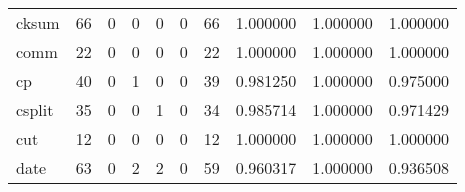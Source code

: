 \begin{longtable}{lrrrrrrrrr}
cksum     &                                      66 &                                                  0 &                                                  0 &                                                  0 &                                                  0 &                                                 66 &                                           1.000000 &                               1.000000 &                             1.000000 \\
comm      &                                      22 &                                                  0 &                                                  0 &                                                  0 &                                                  0 &                                                 22 &                                           1.000000 &                               1.000000 &                             1.000000 \\
cp        &                                      40 &                                                  0 &                                                  1 &                                                  0 &                                                  0 &                                                 39 &                                           0.981250 &                               1.000000 &                             0.975000 \\
csplit    &                                      35 &                                                  0 &                                                  0 &                                                  1 &                                                  0 &                                                 34 &                                           0.985714 &                               1.000000 &                             0.971429 \\
cut       &                                      12 &                                                  0 &                                                  0 &                                                  0 &                                                  0 &                                                 12 &                                           1.000000 &                               1.000000 &                             1.000000 \\
date      &                                      63 &                                                  0 &                                                  2 &                                                  2 &                                                  0 &                                                 59 &                                           0.960317 &                               1.000000 &                             0.936508 \\

\end{longtable}
